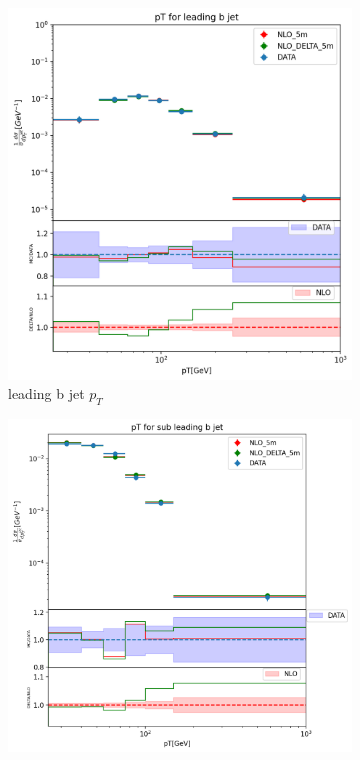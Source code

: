 \documentclass[NOTE, REPORT=true, atlasdraft=true, USenglish]{atlasdoc}
\begin{document}
\begin{figure}[htp]
\centering
\begin{minipage}{\linewidth}
\begin{subfigure}[t]{0.45\textwidth}
\includegraphics[width=\textwidth]{plots/ATLAS_2017_I1495243_lead_bjet_JO.png}
\caption{leading b jet $p_T$} \label{fig:ATLAS_2017_leading_bjet_pT}
\end{subfigure}
\begin{subfigure}[t]{0.5\textwidth}
\includegraphics[width=\textwidth]{plots/ATLAS_2017_I1495243_sub_lead_bjet_JO.png}

\end{subfigure}
\end{minipage}
\end{figure}
\end{document}
